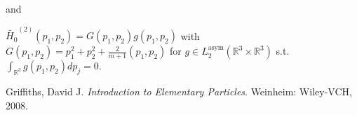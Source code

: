 \documentclass[11pt, a4paper, german]{article}
\numberwithin{equation}{section}
\numberwithin{theorem}{section}
\begin{document}
and

$ \widetilde{H _{0} } ^{\left( 2 \right) } \left( p _{1} , p _{2} \right) = G \left( p _{1} , p _{2} \right) g \left( p _{1} , p _{2} \right) $ with $ G \left( p _{1} , p _{2} \right) = p _{1} ^2 + p _{2} ^2 + \frac{2}{m+1} \left( p _{1} , p _{2} \right) $ for $ g \in L _{2} ^{\text{asym} } \left( \mathbb{R}^{3} \times \mathbb{R}^{3} \right) $ s.t. $ \int_{\mathbb{R}^{3} } g \left( p _{1} , p _{2} \right) dp _{j} = 0. $

\medskip

\begin{thebibliography}{1}
Griffiths, David J. \textit{Introduction to Elementary Particles}. Weinheim: Wiley-VCH, 2008.

\end{thebibliography}
\end{document}

